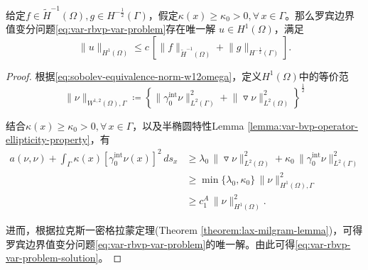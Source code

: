 \begin{theorem}[罗宾边界值变分问题的唯一解]
  给定$f \in \widetilde{H}^{-1}(\Omega), g\in H^{-\frac{1}{2}}(\Gamma)$，假定$\kappa(x) \ge \kappa_{0} > 0, \forall \, x \in \Gamma$。那么罗宾边界值变分问题\eqref{eq:var-rbvp-var-problem}存在唯一解
  $u \in H^{1}(\Omega)$，满足
  \begin{equation}
    \label{eq:var-rbvp-var-problem-solution}
    \big\| u \big\|_{H^{1}(\Omega)} \le c \,
    \left[
    \big\| f \big\|_{\widetilde{H}^{-1} (\Omega)}
    + \big\| g \big\|_{H^{-\frac{1}{2}}(\Gamma)}
    \right].
  \end{equation}
\end{theorem}
\begin{proof}
  根据\eqref{eq:sobolev-equivalence-norm-w12omega}，定义$H^{1}(\Omega)$中的等价范
  \begin{equation*}
    \big\| \nu \big\|_{W^{1,2}(\Omega), \Gamma} \coloneqq
    \left\{
    \big\| \gamma_{0}^{\text{int}} \nu \big\|_{L^2(\Gamma)}^2
    + \big\| \triangledown \nu \big\|_{L^{2}(\Omega)}^2
    \right\}^{\frac{1}{2}}
  \end{equation*}

  结合$\kappa(x) \ge \kappa_{0} > 0, \forall \, x \in \Gamma$，以及半椭圆特性Lemma \ref{lemma:var-bvp-operator-ellipticity-property}，有
  \begin{equation*}
    \begin{split}
      a(\nu,\nu) + \int_{\Gamma} \kappa(x)
      \left[
      \gamma_{0}^{\text{int}} \nu(x)
      \right]^2 \, d s_x
      & \ge
      \lambda_{0} \,
      \big\| \triangledown \nu \big\|_{L^{2}(\Omega)}^{2}
      + \kappa_{0} \, \big\| \gamma_{0}^{\text{int}} \nu \big\|_{L^{2}(\Gamma)}^2 \\
      & \ge
      \min \{ \lambda_0, \kappa_0 \} \,
      \big\| \nu \big\|_{H^{1}(\Omega), \Gamma}^2 \\
      & \ge c_{1}^{A} \, \big\| \nu \big\|_{H^{1}(\Omega)}^2.
    \end{split}
  \end{equation*}

进而，根据拉克斯一密格拉蒙定理(Theorem \ref{theorem:lax-milgram-lemma})，可得罗宾边界值变分问题\eqref{eq:var-rbvp-var-problem}的唯一解。由此可得\eqref{eq:var-rbvp-var-problem-solution}。
\end{proof}
